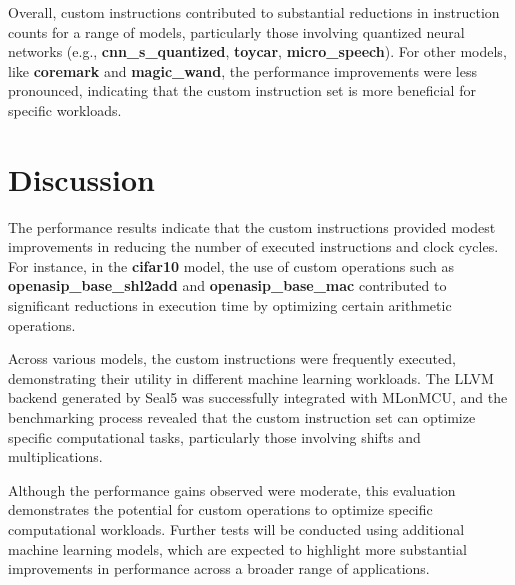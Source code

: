 Overall, custom instructions contributed to substantial reductions in instruction counts for a range of models, particularly those involving quantized neural networks (e.g., \textbf{cnn\_s\_quantized}, \textbf{toycar}, \textbf{micro\_speech}). For other models, like \textbf{coremark} and \textbf{magic\_wand}, the performance improvements were less pronounced, indicating that the custom instruction set is more beneficial for specific workloads.

\section{Discussion}

The performance results indicate that the custom instructions provided modest improvements in reducing the number of executed instructions and clock cycles. For instance, in the \textbf{cifar10} model, the use of custom operations such as \textbf{openasip\_base\_shl2add} and \textbf{openasip\_base\_mac} contributed to significant reductions in execution time by optimizing certain arithmetic operations.

Across various models, the custom instructions were frequently executed, demonstrating their utility in different machine learning workloads. The LLVM backend generated by Seal5 was successfully integrated with MLonMCU, and the benchmarking process revealed that the custom instruction set can optimize specific computational tasks, particularly those involving shifts and multiplications.

Although the performance gains observed were moderate, this evaluation demonstrates the potential for custom operations to optimize specific computational workloads. Further tests will be conducted using additional machine learning models, which are expected to highlight more substantial improvements in performance across a broader range of applications.